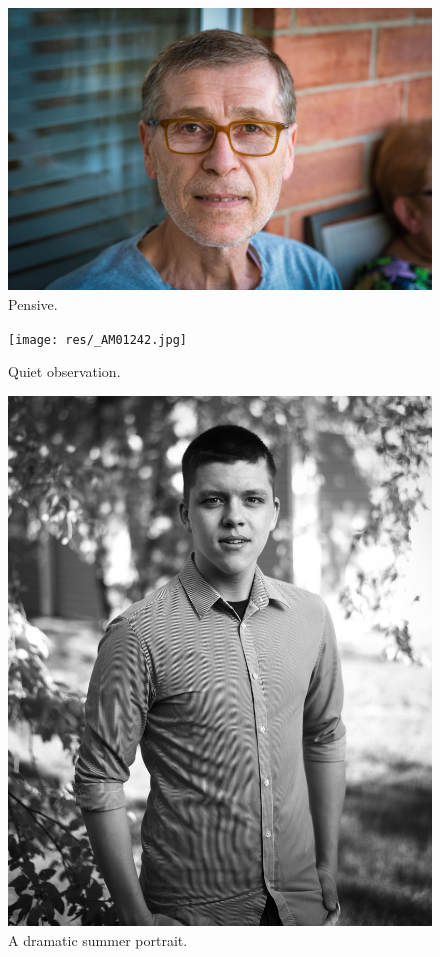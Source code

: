 \documentclass{report}
\begin{document}
\begin{figure}
  \includegraphics[width=\linewidth]{res/portraitheadshot.jpg}
  \caption{Pensive.}
\end{figure}

\begin{figure}
  \texttt{[image: res/\_AM01242.jpg]}
  \caption{Quiet observation.}
\end{figure}

\begin{figure}
  \includegraphics[width=\linewidth]{res/portraitbw.jpg}
  \caption{A dramatic summer portrait.}
\end{figure}
\end{document}

